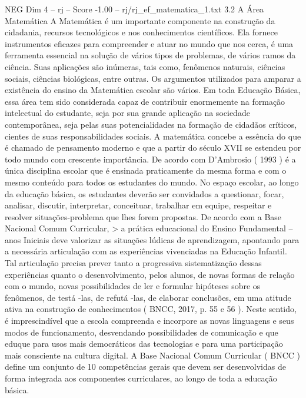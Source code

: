\begin{textsample}{NEG Dim 4 – rj – Score -1.00 – rj/rj\_ef\_matematica\_1.txt}  \label{ex:f4_neg_124}
3.2 A Área Matemática A Matemática é um importante componente na construção da cidadania, recursos tecnológicos e nos conhecimentos científicos.
Ela fornece instrumentos eficazes para compreender e atuar no mundo que nos cerca, é uma ferramenta essencial na solução de vários tipos de problemas, de vários ramos da ciência.
Suas aplicações são inúmeras, tais como, fenômenos naturais, ciências sociais, ciências biológicas, entre outras.
Os argumentos utilizados para amparar a existência do ensino da Matemática escolar são vários.
Em toda Educação Básica, essa área tem sido considerada capaz de contribuir enormemente na formação intelectual do estudante, seja por sua grande aplicação na sociedade contemporânea, seja pelas suas potencialidades na formação de cidadãos críticos, cientes de suas responsabilidades sociais.
A matemática concebe a essência do que é chamado de pensamento moderno e que a partir do século XVII se estendeu por todo mundo com crescente importância.
De acordo com D’Ambrosio ( 1993 ) é a única disciplina escolar que é ensinada praticamente da mesma forma e com o mesmo conteúdo para todos os estudantes do mundo.
No espaço escolar, ao longo da educação básica, os estudantes deverão ser convidados a questionar, focar, analisar, discutir, interpretar, conceituar, trabalhar em equipe, respeitar e resolver situações-problema que lhes forem propostas.
De acordo com a Base Nacional Comum Curricular, > a prática educacional do Ensino Fundamental – anos Iniciais deve valorizar as situações lúdicas de aprendizagem, apontando para a necessária articulação com as experiências vivenciadas na Educação Infantil.
Tal articulação precisa prever tanto a progressiva sistematização dessas experiências quanto o desenvolvimento, pelos alunos, de novas formas de relação com o mundo, novas possibilidades de ler e formular hipóteses sobre os fenômenos, de testá -las, de refutá -las, de elaborar conclusões, em uma atitude ativa na construção de conhecimentos ( BNCC, 2017, p. 55 e 56 ).
Neste sentido, é imprescindível que a escola compreenda e incorpore as novas linguagens e seus modos de funcionamento, desvendando possibilidades de comunicação e que eduque para usos mais democráticos das tecnologias e para uma participação mais consciente na cultura digital.
A Base Nacional Comum Curricular ( BNCC ) define um conjunto de 10 competências gerais que devem ser desenvolvidas de forma integrada aos componentes curriculares, ao longo de toda a educação básica.

\end{textsample}
